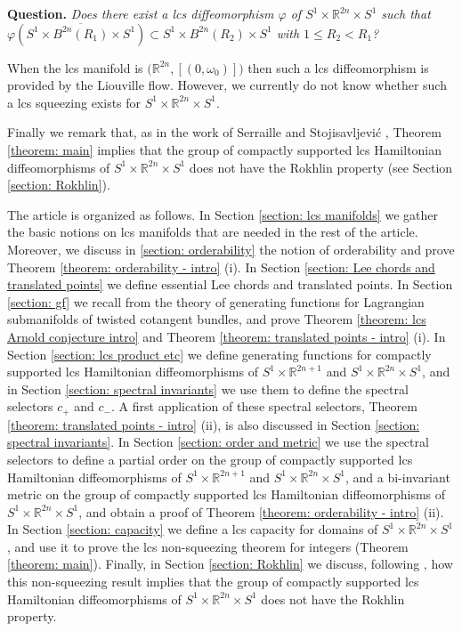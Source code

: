 \documentclass{amsart}
\newcommand{\R}{\mathbb{R}}
\theoremstyle{remark}
\begin{document}
\textbf{Question.} \textit{Does there exist a lcs diffeomorphism $\varphi$ of $S^1 \times \R^{2n} \times S^1 $ such that  $\varphi(\overline{S^1 \times B^{2n}(R_1) \times S^1}) \subset S^1 \times B^{2n}(R_2) \times S^1 $ with $1 \leq R_2 < R_1$?} 

When the lcs manifold is $\big(\R^{2n}, [(0,\omega_0)]\big)$ then such a lcs diffeomorphism is provided by the Liouville flow. However, we currently do not know whether such a lcs squeezing exists for $S^1 \times \R^{2n} \times S^1$. 

Finally we remark that,
as in the work of Serraille and Stojisavljevi\'c \cite{SS},
Theorem \ref{theorem: main} implies that
the group of compactly supported lcs Hamiltonian diffeomorphisms
of $S^1 \times \mathbb{R}^{2n} \times S^1$
does not have the Rokhlin property
(see Section \ref{section: Rokhlin}).

The article is organized as follows.
In Section \ref{section: lcs manifolds}
we gather the basic notions on lcs manifolds
that are needed in the rest of the article.
Moreover, we discuss in \ref{section: orderability}
the notion of orderability
and prove Theorem \ref{theorem: orderability - intro} (i).
In Section \ref{section: Lee chords and translated points}
we define essential Lee chords and translated points.
In Section \ref{section: gf}
we recall from \cite{CM}
the theory of generating functions
for Lagrangian submanifolds of twisted cotangent bundles,
and prove Theorem \ref{theorem: lcs Arnold conjecture intro}
and Theorem \ref{theorem: translated points - intro} (i).
In Section \ref{section: lcs product etc}
we define generating functions for compactly supported
lcs Hamiltonian diffeomorphisms of $S^1 \times \mathbb{R}^{2n+1}$
and $S^1 \times \mathbb{R}^{2n} \times S^1$,
and in Section \ref{section: spectral invariants}
we use them to define the spectral selectors $c_+$ and $c_-$.
A first application of these spectral selectors,
Theorem \ref{theorem: translated points - intro} (ii),
is also discussed in Section \ref{section: spectral invariants}.
In Section \ref{section: order and metric}
we use the spectral selectors
to define a partial order on the group of compactly supported
lcs Hamiltonian diffeomorphisms of $S^1 \times \mathbb{R}^{2n+1}$
and $S^1 \times \mathbb{R}^{2n} \times S^1$,
and a bi-invariant metric on the group of compactly supported
lcs Hamiltonian diffeomorphisms of $S^1 \times \mathbb{R}^{2n} \times S^1$,
and obtain a proof of Theorem \ref{theorem: orderability - intro} (ii).
In Section \ref{section: capacity}
we define a lcs capacity for domains of $S^1 \times \mathbb{R}^{2n} \times S^1$,
and use it to prove the lcs non-squeezing theorem for integers
(Theorem \ref{theorem: main}).
Finally, in Section \ref{section: Rokhlin}
we discuss, following \cite{SS},
how this non-squeezing result
implies that the group of compactly supported lcs Hamiltonian diffeomorphisms
of $S^1 \times \mathbb{R}^{2n} \times S^1$
does not have the Rokhlin property.
\end{document}
